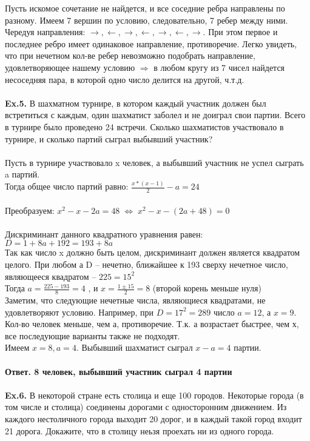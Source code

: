 \documentclass[a4paper,12pt]{article}
\begin{document}
Пусть искомое сочетание не найдется, и все соседние ребра направлены по разному. Имеем 7 вершин по условию, следовательно, 7 ребер между ними.
Чередуя направления: $ \rightarrow , \leftarrow , \rightarrow , \leftarrow , \rightarrow , \leftarrow , \rightarrow $. При этом первое и последнее ребро имеет одинаковое направление, противоречие. Легко увидеть, что при нечетном кол-ве ребер невозможно подобрать направление, удовлетворяющее нашему условию $ \Rightarrow $ в любом кругу из 7 чисел найдется несоседняя пара, в которой одно число делится на другой, ч.т.д.
\\
\\
\textbf{Ex.5.} В шахматном турнире, в котором каждый участник должен был встретиться с каждым, один шахматист заболел и не доиграл свои партии. Всего в турнире было проведено 24 встречи. Сколько шахматистов участвовало в турнире, и сколько партий сыграл выбывший участник?
\\
\\
Пусть в турнире участвовало x человек, а выбывший участник не успел сыграть a партий.
\\
Тогда общее число партий равно: $ \frac{x*(x-1)}{2} - a = 24 $
\\
\\
Преобразуем: $ x^2 - x - 2a = 48 \; \Leftrightarrow \; x^2 - x - (2a + 48) = 0 $
\\
\\
Дискриминант данного квадратного уравнения равен: $ D = 1 + 8a + 192 = 193 + 8a $
\\
Так как число x должно быть целом, дискриминант должен является квадратом целого. При любом а D -- нечетно, ближайшее к 193 сверху нечетное число, являющееся квадратом -- $ 225 = 15^2 $
\\
Тогда $ a = \frac{225 - 193}{8} = 4$ , и $ x = \frac{1 \pm 15}{2}  = 8 $ (второй корень меньше нуля)
\\
Заметим, что следующие нечетные числа, являющиеся квадратами, не удовлетворяют условию. Например, при $ D = 17^2 = 289 $ число $ a = 12 $, а $ x = 9 $. Кол-во человек меньше, чем а, противоречие. Т.к. а возрастает быстрее, чем х, все последующие варианты также не подходят.
\\
Имеем $ x = 8, a = 4 $. Выбывший шахматист сыграл $ x - a = 4 $ партии.
\\
\\
\textbf{Ответ. 8 человек, выбывший участник сыграл 4 партии}
\\
\\
\textbf{Ex.6.} В некоторой стране есть столица и еще 100 городов. Некоторые города (в том числе и столица) соединены дорогами с односторонним движением. Из каждого нестоличного города выходит 20 дорог, и в каждый такой город входит 21 дорога. Докажите, что в столицу неьзя проехать ни из одного города.
\end{document}
